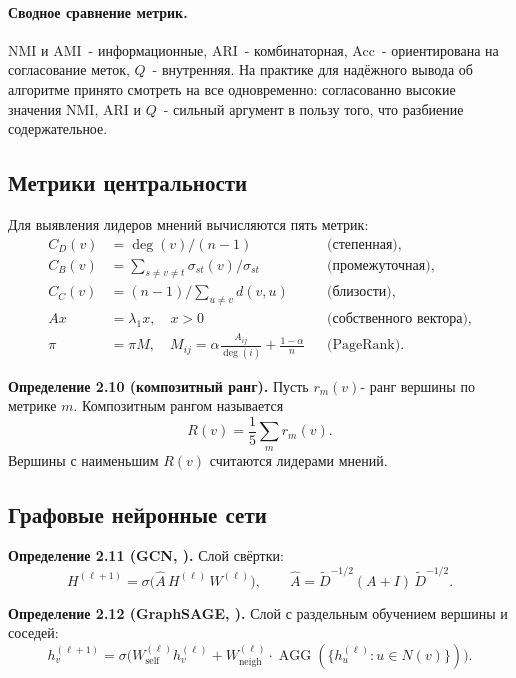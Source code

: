 \documentclass[14pt,a4paper]{extarticle}
\newcommand{\definition}[2]{\par\noindent\textbf{Определение #1.} #2\par}
\begin{document}
\paragraph{Сводное сравнение метрик.} NMI и AMI~- информационные, ARI~- комбинаторная, Acc~- ориентирована на согласование меток, $Q$~- внутренняя. На практике для надёжного вывода об алгоритме принято смотреть на все одновременно: согласованно высокие значения NMI, ARI и $Q$~- сильный аргумент в пользу того, что разбиение содержательное.

\subsection{Метрики центральности}

Для выявления лидеров мнений вычисляются пять метрик:
\begin{align}
C_D(v) &= \deg(v) / (n - 1) && \text{(степенная)}, \\
C_B(v) &= \sum_{s \neq v \neq t} \sigma_{st}(v) / \sigma_{st} && \text{(промежуточная)}, \\
C_C(v) &= (n - 1) / \sum_{u \neq v} d(v, u) && \text{(близости)}, \\
A x &= \lambda_1 x, \quad x > 0 && \text{(собственного вектора)}, \\
\pi &= \pi M, \quad M_{ij} = \alpha \tfrac{A_{ij}}{\deg(i)} + \tfrac{1 - \alpha}{n} && \text{(PageRank)}.
\end{align}

\definition{2.10 (композитный ранг)}{Пусть $r_m(v)$- ранг вершины по метрике $m$. Композитным рангом называется
\begin{equation}
R(v) = \frac{1}{5} \sum_m r_m(v).
\end{equation}
Вершины с наименьшим $R(v)$ считаются лидерами мнений.}

\subsection{Графовые нейронные сети}

\definition{2.11 (GCN, \cite{kipf2017})}{Слой свёртки:
\begin{equation}
H^{(\ell+1)} = \sigma\bigl(\hat A\, H^{(\ell)}\, W^{(\ell)}\bigr), \qquad \hat A = \tilde D^{-1/2} (A + I)\, \tilde D^{-1/2}.
\end{equation}}

\definition{2.12 (GraphSAGE, \cite{hamilton2017})}{Слой с раздельным обучением вершины и соседей:
\begin{equation}
h_v^{(\ell+1)} = \sigma\bigl(W_{\mathrm{self}}^{(\ell)} h_v^{(\ell)} + W_{\mathrm{neigh}}^{(\ell)} \cdot \operatorname{AGG}(\{h_u^{(\ell)} : u \in N(v)\})\bigr).
\end{equation}}
\end{document}
